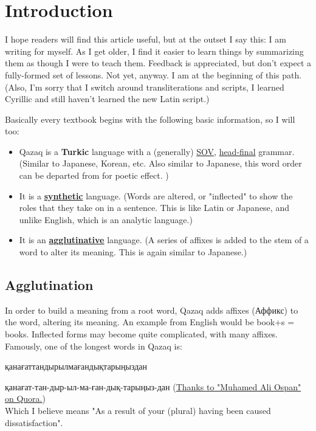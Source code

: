 \documentclass[main.tex]{subfiles}
\begin{document}
\chapter{Introduction}

I hope readers will find this article useful, but at the outset I say this: I am writing for myself. As I get older, I find it easier to learn things by summarizing them as though I were to teach them. Feedback is appreciated, but don't expect a fully-formed set of lessons. Not yet, anyway. I am at the beginning of this path.
(Also, I'm sorry that I switch around transliterations and scripts, I learned Cyrillic and still haven't learned the new Latin script.)

Basically every textbook begins with the following basic information, so I will too:
\begin{itemize}
	\item Qazaq is a \textbf{Turkic} language with a (generally) \href{https://en.wikipedia.org/wiki/Subject-object-verb_word_order}{SOV}, \href{https://en.wikipedia.org/wiki/Head-directionality_parameter}{head-final} grammar.(Similar to Japanese, Korean, etc. Also similar to Japanese, this word order can be departed from for poetic effect. )
	
	\item It is a \href{https://en.wikipedia.org/wiki/Synthetic_language}{\textbf{synthetic}} language. (Words are altered, or "inflected" to show the roles that they take on in a sentence. This is like Latin or Japanese, and unlike English, which is an analytic language.)
	
	\item It is an \href{https://en.wikipedia.org/wiki/Agglutinative_language}{\textbf{agglutinative}} language. (A series of affixes is added to the stem of a word to alter its meaning. This is again similar to Japanese.)
\end{itemize}

\section{Agglutination}
In order to build a meaning from a root word, Qazaq adds affixes (Аффикс) to the word, altering its meaning. An example from English would be book+s = books.
Inflected forms may become quite complicated, with many affixes. Famously, one of the longest words in Qazaq is:

қанағаттандырылмағандықтарыңыздан

қанағат-тан-дыр-ыл-ма-ған-дық-тарыңыз-дан (\href{https://www.quora.com/What-is-the-longest-word-in-Kazakh}{Thanks to "Muhamed Ali Ospan" on Quora.})\\
Which I believe means "As a result of your (plural) having been caused dissatisfaction".
\end{document}
